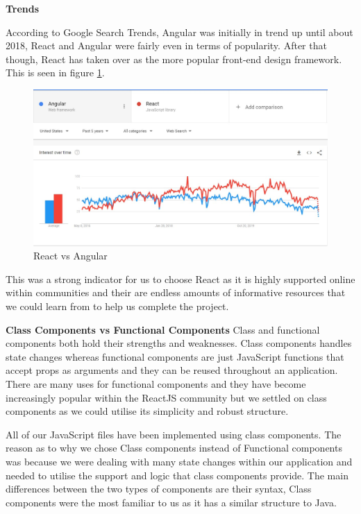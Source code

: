 \textbf{Trends}

According to Google Search Trends, Angular was initially in trend up until about 2018, React and Angular were fairly even in terms of popularity. After that though, React has taken over as the more popular front-end design framework. This is seen in figure \ref{fig:React vs Angular}.

\begin{figure}[H]
  \centering
  \includegraphics[scale=0.45]{img/react_vs_angular.jpg}
  \caption{React vs Angular}
  \label{fig:React vs Angular}
\end{figure}

This was a strong indicator for us to choose React as it is highly supported online within communities and their are endless amounts of informative resources that we could learn from to help us complete the project.

\item \textbf{Class Components vs Functional Components}
Class and functional components both hold their strengths and weaknesses. Class components handles state changes whereas functional components are just JavaScript functions that accept props as arguments and they can be reused throughout an application. There are many uses for functional components and they have become increasingly popular within the ReactJS community but we settled on class components as we could utilise its simplicity and robust structure.

All of our JavaScript files have been implemented using class components. The reason as to why we chose Class components instead of Functional components was because we were dealing with many state changes within our application and needed to utilise the support and logic that class components provide. The main differences between the two types of components are their syntax, Class components were the most familiar to us as it has a similar structure to Java.


